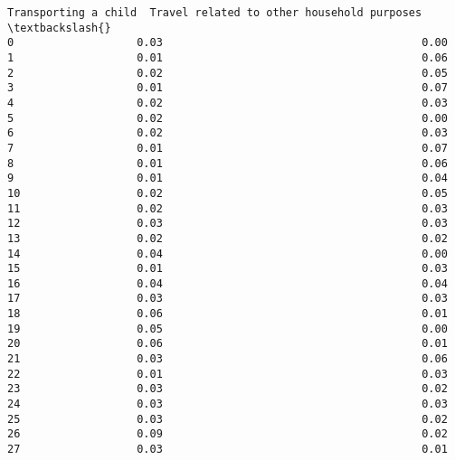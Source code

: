 \documentclass[11pt]{article}
\begin{document}
\begin{Verbatim}[commandchars=\\\{\}]
    Transporting a child  Travel related to other household purposes  \textbackslash{}
0                   0.03                                        0.00   
1                   0.01                                        0.06   
2                   0.02                                        0.05   
3                   0.01                                        0.07   
4                   0.02                                        0.03   
5                   0.02                                        0.00   
6                   0.02                                        0.03   
7                   0.01                                        0.07   
8                   0.01                                        0.06   
9                   0.01                                        0.04   
10                  0.02                                        0.05   
11                  0.02                                        0.03   
12                  0.03                                        0.03   
13                  0.02                                        0.02   
14                  0.04                                        0.00   
15                  0.01                                        0.03   
16                  0.04                                        0.04   
17                  0.03                                        0.03   
18                  0.06                                        0.01   
19                  0.05                                        0.00   
20                  0.06                                        0.01   
21                  0.03                                        0.06   
22                  0.01                                        0.03   
23                  0.03                                        0.02   
24                  0.03                                        0.03   
25                  0.03                                        0.02   
26                  0.09                                        0.02   
27                  0.03                                        0.01   


\end{Verbatim}
\end{document}
